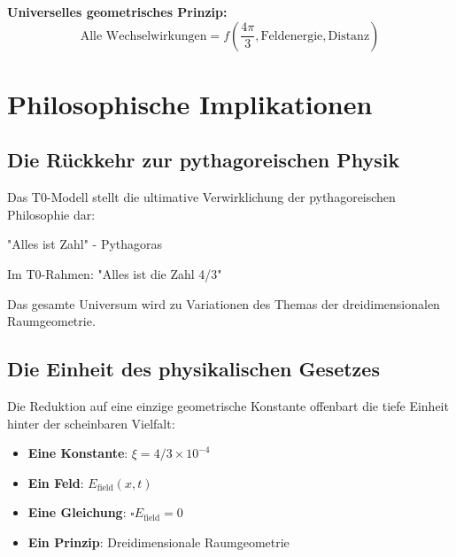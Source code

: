 \documentclass[12pt,a4paper]{report}
\begin{document}
	\textbf{Universelles geometrisches Prinzip:}
	\begin{equation}
		\text{Alle Wechselwirkungen} = f\left(\frac{4\pi}{3}, \text{Feldenergie}, \text{Distanz}\right)
	\end{equation}
	
	\section{Philosophische Implikationen}
	\label{sec:philosophical_implications}
	
	\subsection{Die Rückkehr zur pythagoreischen Physik}
	\label{subsec:pythagorean_physics}
	
	Das T0-Modell stellt die ultimative Verwirklichung der pythagoreischen Philosophie dar:
	
	\begin{tcolorbox}[colback=blue!5!white,colframe=blue!75!black,title=Pythagoreische Erkenntnis]
		"Alles ist Zahl" - Pythagoras
		
		Im T0-Rahmen: "Alles ist die Zahl 4/3"
		
		Das gesamte Universum wird zu Variationen des Themas der dreidimensionalen Raumgeometrie.
	\end{tcolorbox}
	
	\subsection{Die Einheit des physikalischen Gesetzes}
	\label{subsec:unity_physical_law}
	
	Die Reduktion auf eine einzige geometrische Konstante offenbart die tiefe Einheit hinter der scheinbaren Vielfalt:
	
	\begin{itemize}
		\item \textbf{Eine Konstante}: $\xi = 4/3 \times 10^{-4}$
		\item \textbf{Ein Feld}: $E_{\text{field}}(x,t)$
		\item \textbf{Eine Gleichung}: $\square E_{\text{field}} = 0$
		\item \textbf{Ein Prinzip}: Dreidimensionale Raumgeometrie
	\end{itemize}
	
\end{document}
